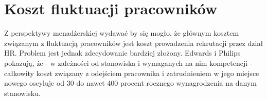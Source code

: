 

\section{Koszt fluktuacji pracowników}\label{sec:koszt-fluktuacji}

Z perspektywy menadżerskiej wydawać by się mogło, że głównym kosztem związanym z fluktuacją pracowników jest koszt prowadzenia rekrutacji przez dział HR.
Problem jest jednak zdecydowanie bardziej złożony.
Edwards i Philips\cite{philips-edwards-2009} pokazują, że - w zależności od stanowiska i wymaganych na nim kompetencji -
całkowity koszt związany z odejściem pracownika i zatrudnieniem w jego miejsce nowego oscyluje od 30 do nawet 400 procent
rocznego wynagrodzenia na danym stanowisku.


